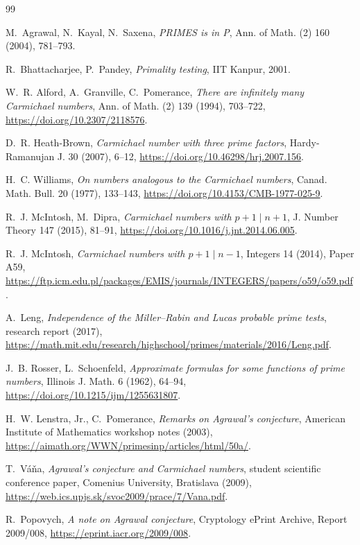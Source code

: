 \documentclass[11pt]{amsart}
\theoremstyle{definition}
\theoremstyle{remark}
\begin{document}
\begin{thebibliography}{99}

M.~Agrawal, N.~Kayal, N.~Saxena,
\emph{PRIMES is in P},
Ann. of Math. (2) 160 (2004), 781--793.

R.~Bhattacharjee, P.~Pandey,
\emph{Primality testing},
IIT Kanpur, 2001.

W.~R. Alford, A.~Granville, C.~Pomerance,
\emph{There are infinitely many Carmichael numbers},
Ann. of Math. (2) 139 (1994), 703--722,
\url{https://doi.org/10.2307/2118576}.

D.~R. Heath-Brown,
\emph{Carmichael number with three prime factors},
Hardy-Ramanujan J. 30 (2007), 6--12,
\url{https://doi.org/10.46298/hrj.2007.156}.

H.~C. Williams,
\emph{On numbers analogous to the Carmichael numbers},
Canad. Math. Bull. 20 (1977), 133--143,
\url{https://doi.org/10.4153/CMB-1977-025-9}.

R.~J. McIntosh, M.~Dipra,
\emph{Carmichael numbers with $p+1\mid n+1$},
J. Number Theory 147 (2015), 81--91,
\url{https://doi.org/10.1016/j.jnt.2014.06.005}.

R.~J. McIntosh,
\emph{Carmichael numbers with $p+1\mid n-1$},
Integers 14 (2014), Paper A59,
\url{https://ftp.icm.edu.pl/packages/EMIS/journals/INTEGERS/papers/o59/o59.pdf}.

A.~Leng,
\emph{Independence of the Miller--Rabin and Lucas probable prime tests},
research report (2017),
\url{https://math.mit.edu/research/highschool/primes/materials/2016/Leng.pdf}.

J.~B. Rosser, L.~Schoenfeld,
\emph{Approximate formulas for some functions of prime numbers},
Illinois J. Math. 6 (1962), 64--94,
\url{https://doi.org/10.1215/ijm/1255631807}.

H.~W. Lenstra, Jr., C.~Pomerance,
\emph{Remarks on Agrawal's conjecture},
American Institute of Mathematics workshop notes (2003),
\url{https://aimath.org/WWN/primesinp/articles/html/50a/}.

T.~V\'a\v na,
\emph{Agrawal's conjecture and Carmichael numbers},
student scientific conference paper, Comenius University, Bratislava (2009),
\url{https://web.ics.upjs.sk/svoc2009/prace/7/Vana.pdf}.

R.~Popovych,
\emph{A note on Agrawal conjecture},
Cryptology ePrint Archive, Report 2009/008,
\url{https://eprint.iacr.org/2009/008}.


\end{thebibliography}
\end{document}
